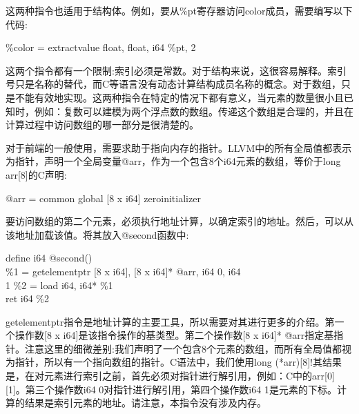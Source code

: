 这两种指令也适用于结构体。例如，要从\%pt寄存器访问color成员，需要编写以下代码:\par

\begin{tcolorbox}[colback=white,colframe=black]
\%color = extractvalue { float, float, i64 } \%pt, 2
\end{tcolorbox}

这两个指令都有一个限制:索引必须是常数。对于结构来说，这很容易解释。索引号只是名称的替代，而C等语言没有动态计算结构成员名称的概念。对于数组，只是不能有效地实现。这两种指令在特定的情况下都有意义，当元素的数量很小且已知时，例如：复数可以建模为两个浮点数的数组。传递这个数组是合理的，并且在计算过程中访问数组的哪一部分是很清楚的。\par

对于前端的一般使用，需要求助于指向内存的指针。LLVM中的所有全局值都表示为指针，声明一个全局变量@arr，作为一个包含8个i64元素的数组，等价于long arr[8]的C声明:\par

\begin{tcolorbox}[colback=white,colframe=black]
@arr = common global [8 x i64] zeroinitializer
\end{tcolorbox}

要访问数组的第二个元素，必须执行地址计算，以确定索引的地址。然后，可以从该地址加载该值。将其放入@second函数中:\par

\begin{tcolorbox}[colback=white,colframe=black]
define i64 @second() { \\
\hspace*{0.5cm}\%1 = getelementptr [8 x i64], [8 x i64]* @arr, i64 0, i64 \\
\hspace*{0.5cm}1
\hspace*{0.5cm}\%2 = load i64, i64* \%1 \\
\hspace*{0.5cm}ret i64 \%2 \\
}
\end{tcolorbox}

getelementptr指令是地址计算的主要工具，所以需要对其进行更多的介绍。第一个操作数[8 x i64]是该指令操作的基类型。第二个操作数[8 x i64]* @arr指定基指针。注意这里的细微差别:我们声明了一个包含8个元素的数组，而所有全局值都视为指针，所以有一个指向数组的指针。C语法中，我们使用long (*arr)[8]!其结果是，在对元素进行索引之前，首先必须对指针进行解引用，例如：C中的arr[0][1]。第三个操作数i64 0对指针进行解引用，第四个操作数i64 1是元素的下标。计算的结果是索引元素的地址。请注意，本指令没有涉及内存。\par

